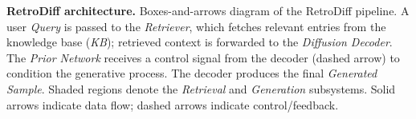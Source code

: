 \caption{\textbf{RetroDiff architecture.} Boxes-and-arrows diagram of the RetroDiff pipeline. A user \textit{Query} is passed to the \textit{Retriever}, which fetches relevant entries from the knowledge base (\textit{KB}); retrieved context is forwarded to the \textit{Diffusion Decoder}. The \textit{Prior Network} receives a control signal from the decoder (dashed arrow) to condition the generative process. The decoder produces the final \textit{Generated Sample}. Shaded regions denote the \textit{Retrieval} and \textit{Generation} subsystems. Solid arrows indicate data flow; dashed arrows indicate control/feedback.}
